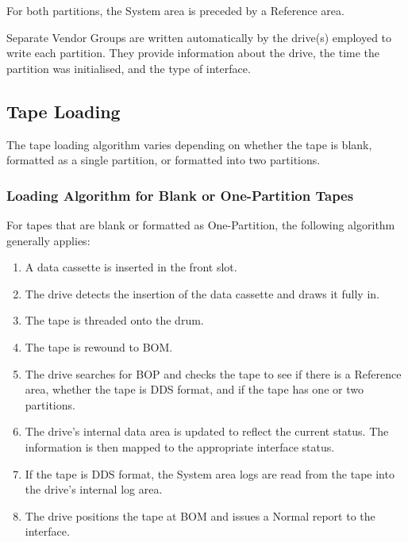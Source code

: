 For both partitions, the System area is preceded by a Reference area.

Separate Vendor Groups are written automatically by the drive(s) employed to
write each partition. They provide information about the drive, the time the
partition was initialised, and the type of interface.

\subsection {Tape Loading}

The tape loading algorithm varies depending on whether the tape is blank,
formatted as a single partition, or formatted into two partitions.

\subsubsection {Loading Algorithm for Blank or One-Partition Tapes}

For tapes that are blank or formatted as One-Partition, the following
algorithm generally applies:

\begin {enumerate}

\item A data cassette is inserted in the front slot.

\item The drive detects the insertion of the data cassette and draws it
fully in.

\item The tape is threaded onto the drum.

\item The tape is rewound to BOM.

\item The drive searches for BOP and checks the tape to see if there is a
Reference area, whether the tape is DDS format, and if the tape has one or
two partitions.

\item The drive's internal data area is updated to reflect the current
status. The information is then mapped to the appropriate interface status.

\item If the tape is DDS format, the System area logs are read from the tape
into the drive's internal log area.

\item The drive positions the tape at BOM and issues a Normal report to the
interface.

\end {enumerate}


